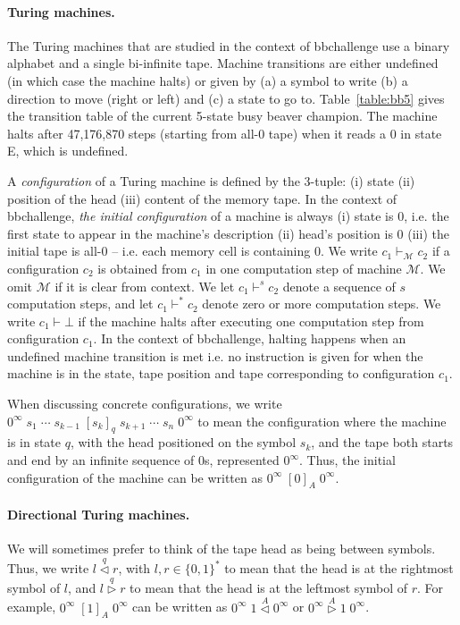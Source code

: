 \documentclass[a4paper,british]{article}
\theoremstyle{definition} %
\numberwithin{equation}{section}
\theoremstyle{remark} %
\newcommand{\lhead}[1]{\stackrel{#1}\triangleleft}
\newcommand{\rhead}[1]{\stackrel{#1}\triangleright}
\begin{document}
\paragraph*{Turing machines.}The Turing machines that are studied in the context of bbchallenge use a binary alphabet and a single bi-infinite tape. Machine transitions are either undefined (in which case the machine halts) or given by (a) a symbol to write (b) a direction to move (right or left) and (c) a state to go to. Table~\ref{table:bb5} gives the transition table of the current 5-state busy beaver champion. The machine halts after 47,176,870 steps (starting from all-0 tape) when it reads a 0 in state E, which is undefined.

A \textit{configuration} of a Turing machine is defined by the 3-tuple: (i) state (ii) position of the head (iii) content of the memory tape. In the context of bbchallenge, \textit{the initial configuration} of a machine is always (i) state is 0, i.e. the first state to appear in the machine's description (ii) head's position is 0 (iii) the initial tape is all-0 -- i.e. each memory cell is containing 0. We write $c_1 \vdash_\mathcal{M} c_2$ if a configuration $c_2$ is obtained from $c_1$ in one computation step of machine $\mathcal{M}$. We omit $\mathcal{M}$ if it is clear from context. We let $c_1 \vdash^s c_2$ denote a sequence of $s$ computation steps, and let  $c_1 \vdash^* c_2$ denote zero or more computation steps. %
We write $c_1 \vdash \bot$ if the machine halts after executing one computation step from configuration $c_1$. In the context of bbchallenge, halting happens when an undefined machine transition  is met i.e. no instruction is given for when the machine is in the state, tape position and tape corresponding to configuration $c_1$.

When discussing concrete configurations, we write
$0^\infty\; s_1\; \cdots\; s_{k-1}\; [s_k]_q\; s_{k+1}\; \cdots\; s_n\; 0^\infty$
to mean the configuration where the machine is in state $q$, with the head
positioned on the symbol $s_k$, and the tape both starts and end by an infinite sequence of 0s, represented $0^\infty$. Thus, the initial configuration of the machine
can be written as $0^\infty\; [0]_A\; 0^\infty$.

\paragraph*{Directional Turing machines.} We will sometimes prefer to think of the tape head as being between
symbols. Thus, we write $l \lhead{q} r$, with $l,r\in\{0,1\}^*$ to mean that the head is at the rightmost symbol
of $l$, and $l \rhead{q} r$ to mean that the head is at the leftmost symbol of $r$.
For example, $0^\infty\; [1]_A\; 0^\infty$ can be written as
$0^\infty\; 1 \lhead A 0^\infty$ or $0^\infty \rhead A 1\; 0^\infty$.
\end{document}
